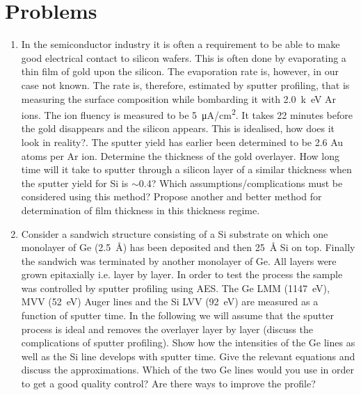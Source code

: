 \section{Problems}
\begin{enumerate}
\item In the semiconductor industry it is often a requirement to be able to make good electrical contact to silicon wafers. This is often done by evaporating a thin film of gold upon the silicon. The evaporation rate is, however, in our case not known. The rate is, therefore, estimated by sputter profiling, that is measuring the surface composition while bombarding it with \SI{2.0}{k\electronvolt} Ar ions. The ion fluency is measured to be \SI{5}{\micro A/cm^2}. It takes 22 minutes before the gold disappears and the silicon appears. This is idealised, how does it look in reality?. The sputter yield has earlier been determined to be 2.6 Au atoms per Ar ion. Determine the thickness of the gold overlayer. How long time will it take to sputter through a silicon layer of a similar thickness when the sputter yield for Si is  $\sim$0.4? Which assumptions/complications must be considered using this method? Propose another and better method for determination of film thickness in this thickness regime.

\item Consider a sandwich structure consisting of a Si substrate on which one monolayer of Ge (\SI{2.5}{\angstrom}) has been deposited and then \SI{25}{\angstrom} Si on top. Finally the sandwich was terminated by another monolayer of Ge. All layers were grown epitaxially i.e. layer by layer. In order to test the process the sample was controlled by sputter profiling using AES. The Ge LMM (\SI{1147}{\electronvolt}), MVV (\SI{52}{\electronvolt}) Auger lines and the Si LVV (\SI{92}{\electronvolt}) are measured as a function of sputter time. In the following we will assume that the sputter process is ideal and removes the overlayer layer by layer (discuss the complications of sputter profiling). Show how the intensities of the Ge lines as well as the Si line develops with sputter time. Give the relevant equations and discuss the approximations. Which of the two Ge lines would you use in order to get a good quality control? Are there ways to improve the profile?
\end{enumerate}